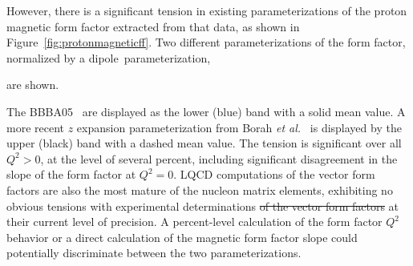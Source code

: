 \documentclass{ar-1col}
\def\asm#1{{\color{blue}#1}}
\def\del#1{}
\begin{document}
However, there is a significant tension in existing parameterizations of the proton magnetic form factor extracted from that data, as
shown in Figure~\ref{fig:protonmagneticff}.
Two different parameterizations of the form factor, normalized by \del{the}\asm{a} dipole\asm{~parameterization},%
\begin{marginnote}
\end{marginnote}%
 are shown.%
\begin{marginnote}
\end{marginnote}%
The BBBA05~\cite{Bradford:2006yz} are displayed as the lower (blue) band with a solid mean value.
A more recent $z$ expansion parameterization from Borah {\it et al.}~\cite{Borah:2020gte} is displayed by the upper (black) band with a dashed mean value.
The tension is significant over all $Q^2 > 0$, at the level of several percent,
including significant disagreement in the slope of the form factor at $Q^2 = 0$.
\del{Of the nucleon form factor calculations from LQCD,}%
\asm{LQCD computations of }the vector form factors are also the most mature \asm{of the nucleon matrix elements},
exhibiting no obvious tensions with experimental determinations
\sout{of the vector form factors }at their current level of precision.
A percent\asm{-}level calculation of the form factor $Q^2$ behavior \del{combined with}\asm{or} a direct calculation of the \del{slope of the }magnetic form factor \asm{slope could potentially }\del{would provide useful insight about this tension or could }discriminate
between the two parameterizations.
\end{document}
